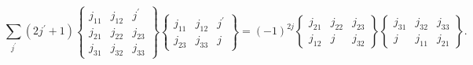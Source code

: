 \[\sum_{j^{\prime}}(2j^{\prime}+1)\begin{Bmatrix}j_{11}&j_{12}&j^{\prime}\\
j_{21}&j_{22}&j_{23}\\
j_{31}&j_{32}&j_{33}\end{Bmatrix}\begin{Bmatrix}j_{11}&j_{12}&j^{\prime}\\
j_{23}&j_{33}&j\end{Bmatrix}={(-1)^{2j}}\begin{Bmatrix}j_{21}&j_{22}&j_{23}\\
j_{12}&j&j_{32}\end{Bmatrix}\begin{Bmatrix}j_{31}&j_{32}&j_{33}\\
j&j_{11}&j_{21}\end{Bmatrix}.\]